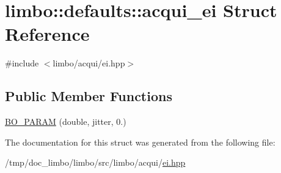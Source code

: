 \hypertarget{structlimbo_1_1defaults_1_1acqui__ei}{}\section{limbo\+:\+:defaults\+:\+:acqui\+\_\+ei Struct Reference}
\label{structlimbo_1_1defaults_1_1acqui__ei}


{\ttfamily \#include $<$limbo/acqui/ei.\+hpp$>$}

\subsection*{Public Member Functions}
\begin{DoxyCompactItemize}
\item 
\hyperlink{group__acqui__defaults_gab43e714d9a9df7e92d6ff205e1d3edc9}{B\+O\+\_\+\+P\+A\+R\+AM} (double, jitter, 0.)
\end{DoxyCompactItemize}


The documentation for this struct was generated from the following file\+:\begin{DoxyCompactItemize}
\item 
/tmp/doc\+\_\+limbo/limbo/src/limbo/acqui/\hyperlink{ei_8hpp}{ei.\+hpp}\end{DoxyCompactItemize}
